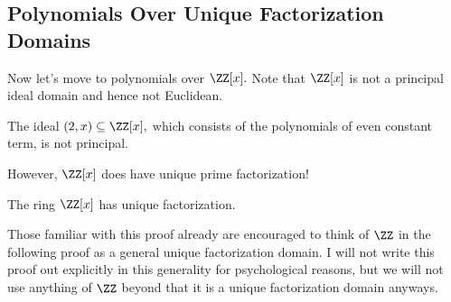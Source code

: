 \documentclass[../notes.tex]{subfiles}
\begin{document}
\subsection{Polynomials Over Unique Factorization Domains}
Now let's move to polynomials over $\ZZ[x].$ Note that $\ZZ[x]$ is not a principal ideal domain and hence not Euclidean.
\begin{example}
	The ideal $(2,x)\subseteq\ZZ[x],$ which consists of the polynomials of even constant term, is not principal.
\end{example}
However, $\ZZ[x]$ does have unique prime factorization!
\begin{theorem} \label{thm:zxufd}
	The ring $\ZZ[x]$ has unique factorization.
\end{theorem}
\begin{remark}[Nir]
	Those familiar with this proof already are encouraged to think of $\ZZ$ in the following proof as a general unique factorization domain. I will not write this proof out explicitly in this generality for psychological reasons, but we will not use anything of $\ZZ$ beyond that it is a unique factorization domain anyways.
\end{remark}
\end{document}
